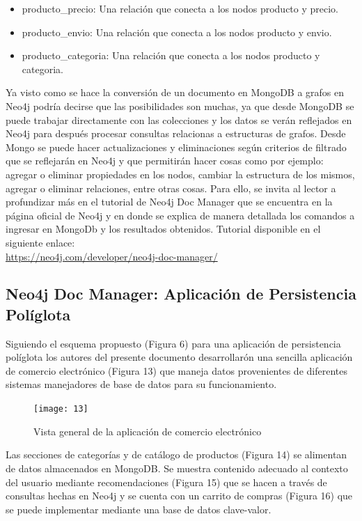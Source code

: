 \documentclass[conference]{IEEEtran}
\begin{document}
\begin{itemize}
\item producto\_precio: Una relaci\'on que conecta a los nodos producto y precio.
\item producto\_envio: Una relaci\'on que conecta a los nodos producto y envio.
\item producto\_categoria: Una relaci\'on que conecta a los nodos producto y categoria.\\
\end{itemize}

Ya visto como se hace la conversi\'on de un documento en MongoDB a grafos en Neo4j podr\'ia decirse que las posibilidades son muchas, ya que desde MongoDB se puede trabajar directamente con las colecciones y los datos se ver\'an reflejados en Neo4j para despu\'es procesar consultas relacionas a estructuras de grafos. Desde Mongo se puede hacer actualizaciones y eliminaciones  seg\'un criterios de filtrado que se reflejar\'an en Neo4j y que permitir\'an hacer cosas como por ejemplo: agregar o eliminar propiedades en los nodos, cambiar la estructura de los mismos, agregar o eliminar relaciones, entre otras cosas. Para ello, se invita al lector a profundizar m\'as en el tutorial de Neo4j Doc Manager que se encuentra en la p\'agina oficial de Neo4j  y en donde se explica de manera detallada los comandos a ingresar en MongoDb y los resultados obtenidos. Tutorial disponible en el siguiente enlace:\\
\url{https://neo4j.com/developer/neo4j-doc-manager/}

\subsection*{Neo4j Doc Manager: Aplicaci\'on de Persistencia Pol\'iglota}

Siguiendo el esquema propuesto (Figura 6) para una aplicaci\'on de persistencia pol\'iglota  los autores del presente documento desarrollar\'on una sencilla aplicaci\'on de comercio electr\'onico (Figura 13) que maneja datos provenientes de diferentes sistemas manejadores de base de datos para su funcionamiento.

\begin{figure}[!h]
\centering
\texttt{[image: 13]}
\caption{Vista general de la aplicaci\'on de comercio electr\'onico}
\label{}
\end{figure}

Las secciones de categor\'ias y de cat\'alogo de productos (Figura 14) se alimentan de datos almacenados en MongoDB. Se muestra contenido adecuado al contexto del usuario mediante recomendaciones (Figura 15) que se hacen a trav\'es de consultas hechas en Neo4j y se cuenta con un carrito de compras (Figura 16) que se puede implementar mediante una base de datos clave-valor.
\end{document}
